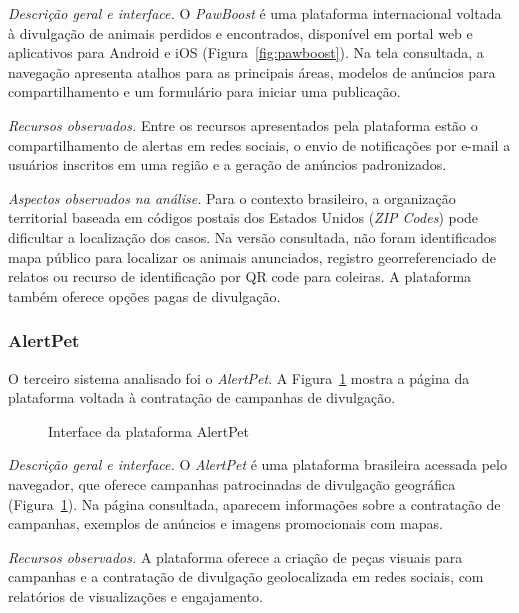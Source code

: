\noindent \textit{Descrição geral e interface.} O \textit{PawBoost} é uma plataforma internacional voltada à divulgação de animais perdidos e encontrados, disponível em portal web e aplicativos para Android e iOS (Figura~\ref{fig:pawboost}). Na tela consultada, a navegação apresenta atalhos para as principais áreas, modelos de anúncios para compartilhamento e um formulário para iniciar uma publicação.

\vspace{0.25cm}
\noindent \textit{Recursos observados.} Entre os recursos apresentados pela plataforma estão o compartilhamento de alertas em redes sociais, o envio de notificações por e-mail a usuários inscritos em uma região e a geração de anúncios padronizados.

\vspace{0.25cm}
\noindent \textit{Aspectos observados na análise.} Para o contexto brasileiro, a organização territorial baseada em códigos postais dos Estados Unidos (\textit{ZIP Codes}) pode dificultar a localização dos casos. Na versão consultada, não foram identificados mapa público para localizar os animais anunciados, registro georreferenciado de relatos ou recurso de identificação por QR code para coleiras. A plataforma também oferece opções pagas de divulgação.


\subsubsection{AlertPet}

O terceiro sistema analisado foi o \textit{AlertPet}. A Figura~\ref{fig:alertpet} mostra a página da plataforma voltada à contratação de campanhas de divulgação.

\begin{figure}[H]
    \centering
    \caption{Interface da plataforma AlertPet}
    \label{fig:alertpet}
\end{figure}

\noindent \textit{Descrição geral e interface.} O \textit{AlertPet} é uma plataforma brasileira acessada pelo navegador, que oferece campanhas patrocinadas de divulgação geográfica (Figura~\ref{fig:alertpet}). Na página consultada, aparecem informações sobre a contratação de campanhas, exemplos de anúncios e imagens promocionais com mapas.

\vspace{0.25cm}
\noindent \textit{Recursos observados.} A plataforma oferece a criação de peças visuais para campanhas e a contratação de divulgação geolocalizada em redes sociais, com relatórios de visualizações e engajamento.

